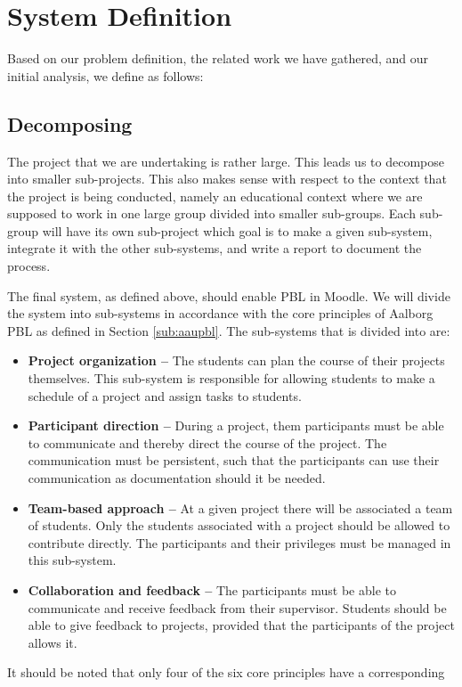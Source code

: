 \section{System Definition}
Based on our problem definition, the related work we have gathered, and our initial analysis, we define \system as follows:












\subsection{Decomposing \system}
\label{sub:decomposingSys}
The project that we are undertaking is rather large.
This leads us to decompose into smaller sub-projects.
This also makes sense with respect to the context that the project is being conducted, namely an educational context where we are supposed to work in one large group divided into smaller sub-groups.
Each sub-group will have its own sub-project which goal is to make a given sub-system, integrate it with the other sub-systems, and write a report to document the process.

The final system, as defined above, should enable PBL in Moodle.
We will divide the system into sub-systems in accordance with the core principles of Aalborg PBL as defined in Section \ref{sub:aaupbl}.
The sub-systems that \system is divided into are:
\begin{itemize}
	\item \textbf{Project organization --} The students can plan the course of their projects themselves.
	This sub-system is responsible for allowing students to make a schedule of a project and assign tasks to students.
	\item \textbf{Participant direction --} During a project, them participants must be able to communicate and thereby direct the course of the project.
	The communication must be persistent, such that the participants can use their communication as documentation should it be needed.
	\item \textbf{Team-based approach --} At a given project there will be associated a team of students.
	Only the students associated with a project should be allowed to contribute directly.
	The participants and their privileges must be managed in this sub-system.
	\item \textbf{Collaboration and feedback --} The participants must be able to communicate and receive feedback from their supervisor.
	Students should be able to give feedback to projects, provided that the participants of the project allows it.
\end{itemize}

It should be noted that only four of the six core principles have a corresponding 











